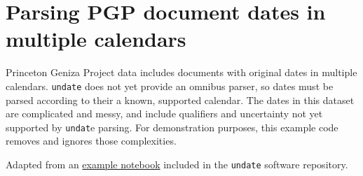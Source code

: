 \documentclass{anthology-ch}         %
\begin{document}
%

\printbibliography

\appendix

\section{Parsing PGP document dates in multiple calendars} \label{appdx:parse-pgp-dates}

Princeton Geniza Project data includes documents with original dates in multiple calendars.  \texttt{undate} does not yet provide an omnibus parser, so dates must be parsed according to their a known, supported calendar.  The dates in this dataset are complicated and messy, and include qualifiers and uncertainty not yet supported by \texttt{undat}e parsing. For demonstration purposes, this example code removes and ignores those complexities.

Adapted from an \href{https://github.com/dh-tech/undate-python/blob/main/examples/pgp_dates.ipynb}{example notebook} included in the \texttt{undate} software repository.
\end{document}
